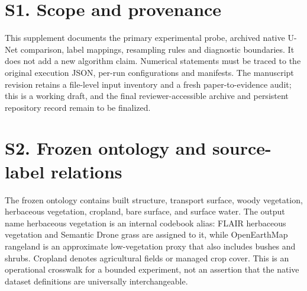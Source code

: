 \section*{S1. Scope and provenance}
This supplement documents the primary experimental probe, archived native U-Net comparison, label mappings, resampling rules and diagnostic boundaries. It does not add a new algorithm claim. Numerical statements must be traced to the original execution JSON, per-run configurations and manifests. The manuscript revision retains a file-level input inventory and a fresh paper-to-evidence audit; this is a working draft, and the final reviewer-accessible archive and persistent repository record remain to be finalized.

\section*{S2. Frozen ontology and source-label relations}
The frozen ontology contains built structure, transport surface, woody vegetation, herbaceous vegetation, cropland, bare surface, and surface water. The output name herbaceous vegetation is an internal codebook alias: FLAIR herbaceous vegetation and Semantic Drone grass are assigned to it, while OpenEarthMap rangeland is an approximate low-vegetation proxy that also includes bushes and shrubs. Cropland denotes agricultural fields or managed crop cover. This is an operational crosswalk for a bounded experiment, not an assertion that the native dataset definitions are universally interchangeable.

